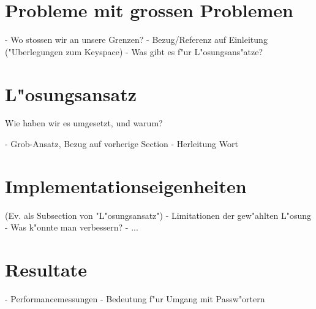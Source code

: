 \begin{refsection}
\section{Probleme mit grossen Problemen}

- Wo stossen wir an unsere Grenzen?
- Bezug/Referenz auf Einleitung ("Uberlegungen zum Keyspace)
- Was gibt es f"ur L"osungsans"atze?

\section{L"osungsansatz}

Wie haben wir es umgesetzt, und warum?

- Grob-Ansatz, Bezug auf vorherige Section
- Herleitung Wort

\section{Implementationseigenheiten}

(Ev. als Subsection von "L"osungsansatz")
- Limitationen der gew"ahlten L"osung
- Was k"onnte man verbessern?
- ...

\section{Resultate}

- Performancemessungen
- Bedeutung f"ur Umgang mit Passw"ortern

\printbibliography[heading=subbibliography]
\end{refsection}
